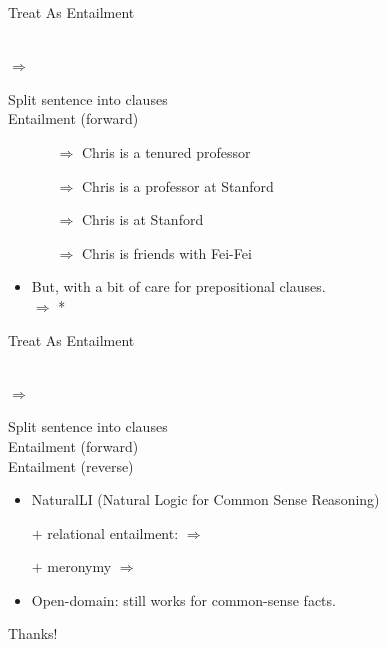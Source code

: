 \documentclass[hyperref]{beamer}
\begin{document}
\begin{frame}{Treat As Entailment}
\begin{center}
   \\ $\Rightarrow$ 
\end{center}

 Split sentence into clauses \\
 Entailment (forward)
\begin{itemize}
  \item[] 
    \begin{itemize}
      \item[$\Rightarrow$] Chris is a tenured professor
      \item[$\Rightarrow$] Chris is a professor at Stanford
      \item[$\Rightarrow$] Chris is at Stanford
    \end{itemize}
  \item[] 
    \begin{itemize}
      \item[$\Rightarrow$] Chris is friends with Fei-Fei
    \end{itemize}
\end{itemize}
\pause

\begin{itemize}
  \item But, with a bit of care for prepositional clauses. \\
        $\Rightarrow$ * 
\end{itemize}
\end{frame}

\begin{frame}{Treat As Entailment}
\begin{center}
   \\ $\Rightarrow$ 
\end{center}

 Split sentence into clauses \\
 Entailment (forward) \\
 Entailment (reverse)
\begin{itemize}
  \item NaturalLI (Natural Logic for Common Sense Reasoning)
  \pause
  \item[] $+$ relational entailment:  $\Rightarrow$ 
  \pause
  \item[] $+$ meronymy  $\Rightarrow$ 
  \pause
  \item Open-domain: still works for common-sense facts.
\end{itemize}
\pause

\vspace{0.5cm}
\begin{center}
  \large{Thanks!}
\end{center}
\end{frame}
\end{document}
